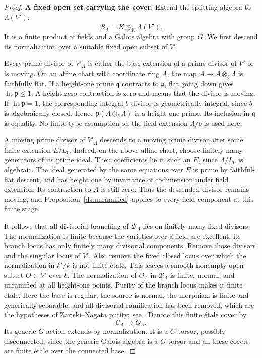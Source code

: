\begin{proof}
\smallskip\noindent\textbf{A fixed open set carrying the cover.}\enspace
Extend the splitting algebra to $\Lambda(V')$:
\[
 \mathcal B_\Lambda
   =\widetilde K\otimes_K\Lambda(V').
\]
It is a finite product of fields and a Galois algebra with group
$G$.  We first descend its normalization over a suitable fixed
open subset of $V'$.

Every prime divisor of $V'_\Lambda$ is either the base extension
of a prime divisor of $V'$ or is moving. On an affine chart with
coordinate ring $A$, the map $A\to A\otimes_b\Lambda$ is faithfully
flat. If a height-one prime $\mathfrak q$ contracts to $\mathfrak p$,
flat going down gives $\operatorname{ht}\mathfrak p\leq1$.
A height-zero contraction is zero and means that the divisor is moving.
If $\operatorname{ht}\mathfrak p=1$, the corresponding integral
$b$-divisor is geometrically integral, since $b$ is algebraically
closed. Hence $\mathfrak p(A\otimes_b\Lambda)$ is a height-one
prime. Its inclusion in $\mathfrak q$ is equality. No finite-type
assumption on the field extension $\Lambda/b$ is used here.

A moving prime divisor of $V'_\Lambda$ descends to a moving prime
divisor after some finite extension $E/L_0$. Indeed, on the above
affine chart, choose finitely many generators of its prime ideal.
Their coefficients lie in such an $E$, since $\Lambda/L_0$ is
algebraic. The ideal generated by the same equations over $E$ is
prime by faithful-flat descent, and has height one by invariance of
codimension under field extension. Its contraction to $A$ is still
zero. Thus the descended divisor remains moving, and
Proposition~\ref{ds:unramified} applies to every field component at
this finite stage.

It follows that all divisorial branching of $\mathcal B_\Lambda$
lies on finitely many fixed divisors. The normalization is finite
because the varieties over a field are excellent; its branch locus
has only finitely many divisorial components.  Remove those divisors and
the singular locus of $V'$.  Also remove the fixed closed locus
over which the normalization in $k'/k$ is not finite \'etale.
This leaves a smooth nonempty open subset $O\subset V'$ over $b$.
The normalization of $O_\Lambda$ in $\mathcal B_\Lambda$ is
finite, normal, and unramified at all height-one points.  Purity
of the branch locus makes it finite \'etale.  Here the base is
regular, the source is normal, the morphism is finite and
generically separable, and all divisorial ramification has been
removed, which are the hypotheses of Zariski--Nagata purity;
see \cite[Expos\'e~X, Th\'eor\`eme~3.1]{SGA1}.
Denote this finite \'etale cover by
\[
 \mathcal C_\Lambda\longrightarrow O_\Lambda.
\]
Its generic $G$-action extends by normalization.  It is a
$G$-torsor, possibly disconnected, since the generic Galois
algebra is a $G$-torsor and all these covers are finite \'etale
over the connected base.


\end{proof}
